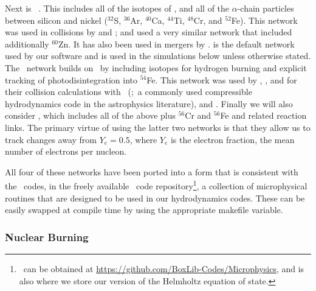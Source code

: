\documentclass[12pt]{article}
\begin{document}
Next is \aproxthirteen\ \citep{timmes:1999,timmes:2000}. This includes
all of the isotopes of \isoseven, and all of the $\alpha$-chain particles between
silicon and nickel (${}^{32}$S, ${}^{36}$Ar, ${}^{40}$Ca, ${}^{44}$Ti, ${}^{48}$Cr,
and ${}^{52}$Fe). This network was used in collisions by \citet{hawley:2012} and
\citet{raskin:2010}; \citet{loren-aguilar:2010} and \citet{garcia-senz:2013} used a
very similar network that included additionally ${}^{60}$Zn. It has also been used in mergers
by \citet{raskin:2012,raskin:2014}. \aproxthirteen is the default network used by our
software and is used in the simulations below unless otherwise stated. The \aproxnineteen\
network \citep{timmes:1999} builds on \aproxthirteen\ by including isotopes for
hydrogen burning and explicit tracking of photodisintegration into ${}^{54}$Fe.
This network was used by \citet{kushnir:2013}, \citet{kushnir:2014}, and \citet{rosswog:2009}
for their collision calculations with \flash\ (\citealt{fryxell:2000};\ a commonly used compressible hydrodynamics code
in the astrophysics literature), and \citet{papish:2015}. Finally we will also
consider \aproxtwentyone, which includes all of the above plus ${}^{56}$Cr
and ${}^{56}$Fe and related reaction links. The primary virtue of using
the latter two networks is that they allow us to track changes away from
$Y_e = 0.5$, where $Y_e$ is the electron fraction, the mean number of electrons
per nucleon.

All four of these networks have been ported into a form that is consistent
with the \boxlib\ codes, in the freely available \microphysics\ code
repository\footnote{\microphysics\ can be obtained at \url{https://github.com/BoxLib-Codes/Microphysics},
and is also where we store our version of the Helmholtz equation of state.},
a collection of microphysical routines that are designed to be used in our
hydrodynamics codes. These can be easily swapped at compile time by using the
appropriate makefile variable.



\subsubsection{Nuclear Burning}
\label{sec:burning}
\end{document}
